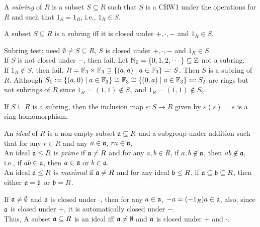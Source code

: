 \begin{definition}
    A \emph{subring} of $R$ is a subset $S \subseteq R$ such that $S$ is a CRW1 under the operations for $R$ and such that $1_S = 1_R$, i.e., $1_R \in S$.
\end{definition}

\begin{fact}
    A subset $S \subseteq R$ is a subring iff it is closed under $+,\cdot,-$ and $1_R \in S$.
\end{fact}

\begin{example}
    Subring test: need $\emptyset \neq S \subseteq R$, $S$ is closed under $+,\cdot,-$ and $1_R \in S$. \\
    If $S$ is not closed under $-$, then fail. Let $\mathbb{N}_0 = \{0,1,2,\cdots\} \subseteq \mathbb{Z}$ not a subring. \\
    If $1_R \not \in S$, then fail. $R = \mathbb{F}_3 \times \mathbb{F}_3 \supseteq \{(a,a) \mid a \in \mathbb{F}_3\} =: S$. Then $S$ is a subring of $R$. Although $S_1 := \{(a,0) \mid a \in \mathbb{F}_3\} \cong \mathbb{F}_3 \cong \{(0,a) \mid a \in \mathbb{F}_3\} =: S_2$ are rings but not subrings of $R$ since $1_R = (1,1) \not \in S_1$ and $1_R = (1,1) \not \in S_2$. 
\end{example}

\begin{fact}
    If $S \subseteq R$ is a subring, then the inclusion map $\varepsilon: S \to R$ given by $\varepsilon(s) = s$ is a ring homomorphism.
\end{fact}

\begin{definition}
    An \emph{ideal} of $R$ is a non-empty subset $\mathfrak{a} \subseteq R$ and a subgroup under addition such that for any $r \in R$ and any $a \in \mathfrak{a}$, $ra \in \mathfrak{a}$. \\
    An ideal $\mathfrak{a} \leq R$ is \emph{prime} if $\mathfrak{a} \neq R$ and for any $a,b \in R$, if $a,b \not \in \mathfrak{a}$, then $ab \not \in \mathfrak{a}$, i.e., if $ab \in \mathfrak{a}$, then $a \in \mathfrak{a}$ or $b \in \mathfrak{a}$. \\
    An ideal $\mathfrak{a} \leq R$ is \emph{maximal} if $\mathfrak{a} \neq R$ and for any ideal $\mathfrak{b} \leq R$, if $\mathfrak{a} \subseteq \mathfrak{b} \subseteq R$, then either $\mathfrak{a} = \mathfrak{b}$ or $\mathfrak{b} = R$.
\end{definition}

\begin{fact}
    If $\mathfrak{a} \neq \emptyset$ and $\mathfrak{a}$ is closed under $\cdot$, then for any $a \in \mathfrak{a}$, $-a = (-1_R)a \in \mathfrak{a}$, also, since $\mathfrak{a}$ is closed under $+$, it is automatically closed under $-$. \\
    Thus, A subset $\mathfrak{a} \subseteq R$ is an ideal iff $\mathfrak{a} \neq \emptyset$ and $\mathfrak{a}$ is closed under $+$ and $\cdot$. 
\end{fact}

